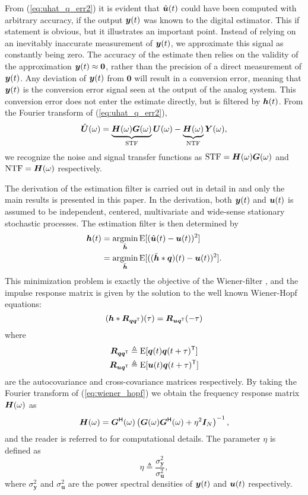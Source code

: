 From (\ref{eq:uhat_q_err2}) it is evident that $\hat{\bm{u}}(t)$ could have been computed with arbitrary accuracy, if the output $\bm{y}(t)$ was known to the digital estimator. This if statement is obvious, but it illustrates an important point. Instead of relying on an inevitably inaccurate measurement of $\bm{y}(t)$, we approximate this signal as constantly being zero. The accuracy of the estimate then relies on the validity of the approximation $\bm{y}(t) \approx \bm{0}$, rather than the precision of a direct measurement of $\bm{y}(t)$. Any deviation of $\bm{y}(t)$ from $\bm{0}$ will result in a conversion error, meaning that $\bm{y}(t)$ is the conversion error signal seen at the output of the analog system. This conversion error does not enter the estimate directly, but is filtered by $\bm{h}(t)$. From the Fourier transform of (\ref{eq:uhat_q_err2}),
\begin{equation}
    \label{eq:F_uhat_err2}
    \hat{\bm{U}}(\omega) =  \underbrace{\bm{H}(\omega) \bm{G}(\omega)}_\text{STF}\bm{U}(\omega) - \underbrace{\bm{H}(\omega)}_\text{NTF}\bm{Y}(\omega),
\end{equation}
we recognize the noise and signal transfer functions as $\text{STF} = \bm{H}(\omega) \bm{G}(\omega)$ and $\text{NTF} = \bm{H}(\omega)$ respectively.

The derivation of the estimation filter is carried out in detail in \cite{malmberg_thesis} and only the main results is presented in this paper. In the derivation, both $\bm{y}(t)$ and $\bm{u}(t)$ is assumed to be independent, centered, multivariate and wide-sense stationary stochastic processes. The estimation filter is then determined by
\begin{align}
    \bm{h}(t)    & = \operatorname*{argmin}_{\bar{\bm{h}}} \text{E}[(\hat{\bm{u}}(t) - \bm{u}(t))^2] \\
            & = \operatorname*{argmin}_{\bar{\bm{h}}} \text{E}[((\bar{\bm{h}}*\bm{q})(t) - \bm{u}(t))^2].
\end{align}
This minimization problem is exactly the objective of the Wiener-filter \cite{optimal_filtering}, and the impulse response matrix is given by the solution to the well known Wiener-Hopf equations:
\begin{equation}
    \label{eq:wiener_hopf}
    (\bm{h}* \bm{R}_{\bm{q}\bm{q}^\mathsf{T}})(\tau) = \bm{R}_{\bm{u}\bm{q}^\mathsf{T}}(-\tau)
\end{equation}
where
\begin{align}
    \bm{R}_{\bm{q}\bm{q}^\mathsf{T}} & \triangleq \text{E}[\bm{q}(t)\bm{q}(t+\tau)^\mathsf{T}] \\
    \bm{R}_{\bm{u}\bm{q}^\mathsf{T}} & \triangleq \text{E}[\bm{u}(t)\bm{q}(t+\tau)^\mathsf{T}]
\end{align}
are the autocovariance and cross-covariance matrices respectively. By taking the Fourier transform of (\ref{eq:wiener_hopf}) we obtain the frequency response matrix $\bm{H}(\omega)$ as
\begin{equation}
    \label{eq:Hw}
    \bm{H}(\omega) = \bm{G}^\mathsf{H}(\omega) \left( \bm{G}(\omega)\bm{G}^\mathsf{H}(\omega) + \eta^2\bm{I}_N \right)^{-1},
\end{equation}
and the reader is referred to \cite{malmberg_thesis} for computational details.
The parameter $\eta$ is defined as
\begin{equation}
    \label{eq:def_eta}
    \eta \triangleq \frac{\sigma_{\bm{y}}^2}{\sigma_{\bm{u}}^2},
\end{equation}
where $\sigma_{\bm{y}}^2$ and $\sigma_{\bm{u}}^2$ are the power spectral densities of $\bm{y}(t)$ and $\bm{u}(t)$ respectively.




